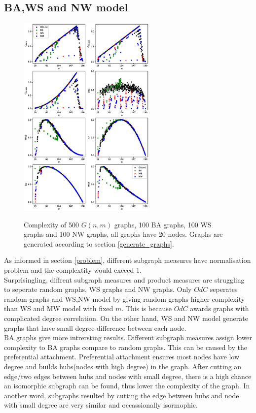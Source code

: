 \documentclass[12pt]{article}
\begin{document}
\subsection{BA,WS and NW model}
\label{complexity_sp}
\begin{figure}[ht]
    \centering
    \includegraphics[width = 0.6\textwidth]{complexities_sp.eps}
    \label{fig:graph_models}
    \caption{Complexity of 500 $G(n,m)$ graphs, 100 BA graphs, 100 WS graphs and 100 NW graphs, all graphs have 20 nodes. Graphs are generated according to section \ref{generate_graphs}.}
\end{figure}
As informed in section \ref{problem}, different subgraph measures have normalisation problem and the complextity would exceed 1.\\
Surprisingling, diffrent subgraph measures and product measures are struggling to seperate random graphs, WS graphs and NW graphs. Only $OdC$ seperates random graphs and WS,NW model by giving random graphs higher complexity than WS and MW model with fixed $m$. This is because $OdC$ awards graphs with complicated degree correlation. On the other hand, WS and NW model generate graphs that have small degree difference between each node.\\
BA graphs give more intrersting results. Different subgraph measures assign lower complexity to BA graphs compare to random graphs. This can be caused by the preferential attachment. Preferential attachment ensures most nodes have low degree and builds hubs(nodes with high degree) in the graph. After cutting an edge/two edges between hubs and nodes with small degree, there is a high chance an isomorphic subgraph can be found, thus lower the complexity of the graph. In another word, subgraphs resulted by cutting the edge between hubs and node with small degree are very similar and occassionally isormophic.\\
\end{document}
